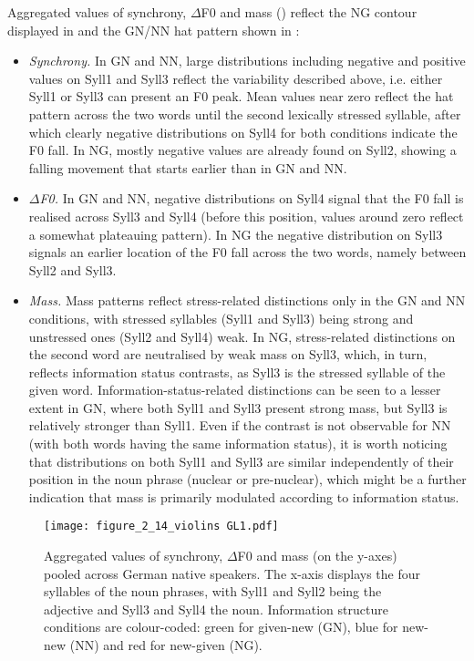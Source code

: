 Aggregated values of synchrony, ${\Delta}$F0 and mass () reflect the NG contour displayed in  and the GN/NN hat pattern shown in :

\begin{itemize}
\item \textit{Synchrony.} In GN and NN, large distributions including negative and positive values on Syll1 and Syll3 reflect the variability described above, i.e. either Syll1 or Syll3 can present an F0 peak. Mean values near zero reflect the hat pattern across the two words until the second lexically stressed syllable, after which clearly negative distributions on Syll4 for both conditions indicate the F0 fall. In NG, mostly negative values are already found on Syll2, showing a falling movement that starts earlier than in GN and NN.
\item \textit{${\Delta}$F0.} In GN and NN, negative distributions on Syll4 signal that the F0 fall is realised across Syll3 and Syll4 (before this position, values around zero reflect a somewhat plateauing pattern). In NG the negative distribution on Syll3 signals an earlier location of the F0 fall across the two words, namely between Syll2 and Syll3.
\item \textit{Mass.} Mass patterns reflect stress-related distinctions only in the GN and NN conditions, with stressed syllables (Syll1 and Syll3) being strong and unstressed ones (Syll2 and Syll4) weak. In NG, stress-related distinctions on the second word are neutralised by weak mass on Syll3, which, in turn, reflects information status contrasts, as Syll3 is the stressed syllable of the given word. Information-status-related distinctions can be seen to a lesser extent in GN, where both Syll1 and Syll3 present strong mass, but Syll3 is relatively stronger than Syll1. Even if the contrast is not observable for NN (with both words having the same information status), it is worth noticing that distributions on both Syll1 and Syll3 are similar independently of their position in the noun phrase (nuclear or pre-nuclear), which might be a further indication that mass is primarily modulated according to information status.
\end{itemize}


\begin{figure}
\texttt{[image: figure\_2\_14\_violins GL1.pdf]}
\caption{Aggregated values of synchrony, ${\Delta}$F0 and mass (on the y-axes) pooled across German native speakers. The x-axis displays the four syllables of the noun phrases, with Syll1 and Syll2 being the adjective and Syll3 and Syll4 the noun. Information structure conditions are colour-coded: green for given-new (GN), blue for new-new (NN) and red for new-given (NG).}
\label{fig:2.14}
\end{figure}

